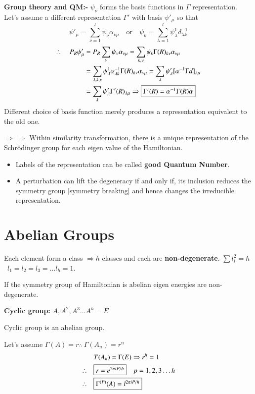 \noindent
{\bf Group theory and QM:-}
$\psi_{\nu}$ forms the basis functions in $\Gamma$ representation. Let's assume a different representation $\Gamma'$ with basis $\psi'_{\mu}$ so that 
$$
\psi'_{\mu}=\sum\limits^{l}_{\nu=1}\psi_{\nu}\alpha_{\nu\mu}\quad\text{or}\quad \psi_{k}=\sum\limits^{l}_{\lambda=1}\psi^{1}_{\lambda}d^{-1}_{\lambda k}
$$
\begin{align*}
\therefore\quad P_{R}\psi'_{\mu} &= P_{R}\sum\limits_{\nu}\psi_{\nu}\alpha_{\nu\mu}=\sum\limits_{k,\nu}\psi_{k}\Gamma(R)_{k\nu}\alpha_{\nu\mu}\\
&= \sum\limits_{\lambda,k,\nu}\psi^{1}_{\lambda}\alpha^{-1}_{\lambda k}\Gamma(R)_{k\nu}\alpha_{\nu\mu}=\sum\limits_{\lambda}\psi'_{\lambda}[\alpha^{-1}\Gamma d]_{\lambda\mu}\\
&= \sum\limits_{\lambda}\psi'_{\lambda}\Gamma'(R)_{\lambda\mu}\Rightarrow \fbox{$\Gamma'(R)=\alpha^{-1}\Gamma(R)\alpha$}
\end{align*}
Different choice of basis function merely produces a representation equivalent to the old one.

$\Rightarrow \ \Rightarrow$ Within similarity transformation, there is a unique representation of the Schr\"odinger group for each eigen value of the Hamiltonian.
\begin{itemize}
\item Labels of the representation can be called {\bf good Quantum Number}.

\item A perturbation can lift the degeneracy if and only if, its inclusion reduces the symmetry group [symmetry breaking] and hence changes the irreducible representation.
\end{itemize}

\section*{Abelian Groups}

Each element form a class $\Rightarrow h$ classes and each are {\bf non-degenerate}. $\sum l^{2}_{i}=h$ \ $l_{1}=l_{2}=l_{3}=\ldots l_{h}=1$.

If the symmetry group of Hamiltonian is abelian eigen energies are non-degenerate.

\medskip
\noindent
{\bf Cyclic group:} $A, A^{2},A^{3}\ldots A^{h}=E$

Cyclic group is an abelian group.

Let's assume $\Gamma(A)=r$\quad $\therefore \ \Gamma(A_{n})=r^{n}$
\begin{align*}
 & T(A_{h})=\Gamma(E)\Rightarrow r^{h}=1\\
\therefore\quad &\fbox{$r=e^{2\pi iP/h}$}\quad p=1,2,3\ldots h\\
\therefore\quad &\fbox{$\Gamma^{(P)}(A)=l^{2\pi iP/h}$}
\end{align*}

